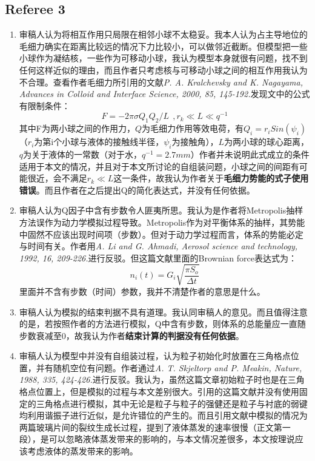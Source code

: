\documentclass[a4paper,11pt]{article}
\begin{document}
\subsection{Referee 3}
\begin{enumerate}
\item
审稿人认为将相互作用只局限在相邻小球不太稳妥。我本人认为占主导地位的毛细力确实在距离比较远的情况下力比较小，可以做邻近截断。但模型把一些小球作为凝结核，一些作为可移动小球，我认为模型本身就很有问题，找不到任何这样近似的理由，而且作者只考虑核与可移动小球之间的相互作用我认为不合理。查看作者毛细力所引用的文献\textsl{P. A. Kralchevsky and K. Nagayama, Advances in Colloid and Interface Science, 2000, 85, 145-192.}发现文中的公式有限制条件：
\begin{equation}
	F = -2 \pi \sigma Q_{1}Q_{2}/L ~~ , r_{k} \ll L \ll q^{-1}
\end{equation}
其中F为两小球之间的作用力，$Q$为毛细力作用等效电荷，有$Q_{i}= r_{i}Sin(\psi_{i}) $（$r_{i}$为第i个小球与液体的接触线半径，$\psi_{i}$为接触角），$L$为两小球的球心距离，$q$为关于液体的一常数（对于水，$q^{-1} = 2.7 mm $）作者并未说明此式成立的条件适用于本文的情况，并且对于本文所讨论的自组装问题，小球之间的间距有可能很近，会不满足$r_{k} \ll L$这一条件，故我认为作者关于\textbf{毛细力势能的式子使用错误}。而且作者在之后提出Q的简化表达式，并没有任何依据。

\item  审稿人认为Q因子中含有步数令人匪夷所思。我认为是作者将Metropolis抽样方法误作为动力学模拟过程导致。Metropolis作为对平衡体系的抽样，其势能中固然不应该出现时间项（步数）。但对于动力学过程而言，体系的势能必定与时间有关。作者用\textsl{A. Li and G. Ahmadi, Aerosol science and technology, 1992, 16, 209-226.}进行反驳。但这篇文献里面的Brownian force表达式为：
\begin{equation}
	n_{i}(t) = G_{i}\sqrt{\frac{\pi S_{o}}{\Delta t}}
\end{equation}
里面并不含有步数（时间）参数，我并不清楚作者的意思是什么。

\item  审稿人认为模拟的结束判据不具有道理。我认同审稿人的意见。而且值得注意的是，若按照作者的方法进行模拟，Q中含有步数，则体系的总能量应一直随步数衰减至0，故我认为作者\textbf{结束计算的判据没有任何依据}。

\item  审稿人认为模型中并没有自组装过程，认为粒子初始化时放置在三角格点位置，并有随机空位有问题。作者通过\textsl{A. T. Skjeltorp and P. Meakin, Nature, 1988, 335, 424-426.}进行反驳。我认为，虽然这篇文章初始粒子时也是在三角格点位置上，但是模拟的过程与本文差别很大。引用的这篇文献并没有使用固定的三角格点进行模拟，其中无论是粒子与粒子的强健还是粒子与衬底的弱键均利用谐振子进行近似，是允许错位的产生的。而且引用文献中模拟的情况为两篇玻璃片间的裂纹生成长过程，提到了液体蒸发的速率很慢（正文第一段），是可以忽略液体蒸发带来的影响的，与本文情况差很多，本文按理说应该考虑液体的蒸发带来的影响。


\end{enumerate}
\end{document}
